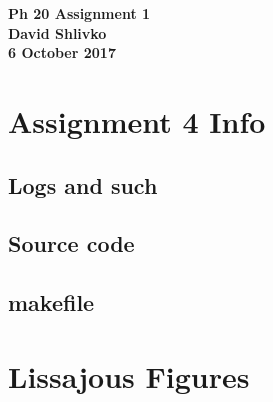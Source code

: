\documentclass{article}
\begin{document}
\begin{center}
\textbf{\huge{Ph 20 Assignment 1}} \\
\textbf{\Large{David Shlivko}} \\
\textbf{\large{6 October 2017}}
\end{center}

\section{Assignment 4 Info}

\subsection{Logs and such}

\subsection{Source code}

\subsection{makefile}


\section{Lissajous Figures}
\end{document}
